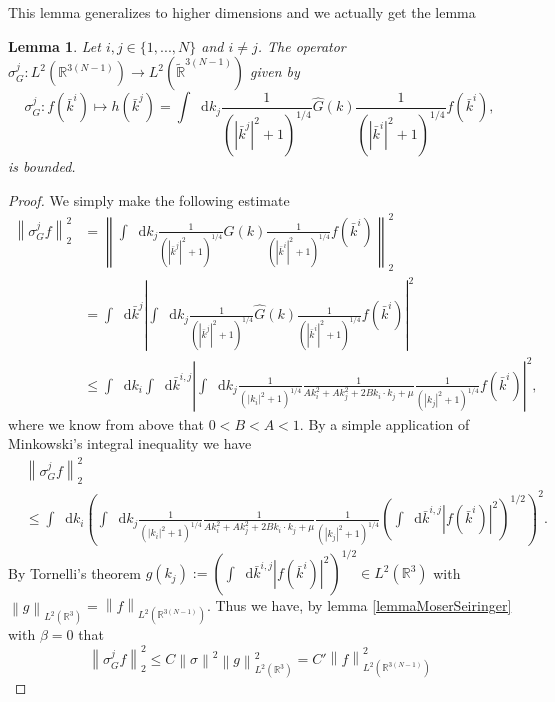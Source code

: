 \documentclass[a4paper,11pt]{article}
\newcommand{\norm}[1]{\left\lVert #1 \right\rVert}
\newcommand{\abs}[1]{\left\lvert #1 \right\rvert}
\newcommand*\diff{\mathop{}\!\mathrm{d}}
\newcommand{\R}{\mathbb{R}}
\newtheorem{lemma}{Lemma}
\numberwithin{equation}{section}
\begin{document}
This lemma generalizes to higher dimensions and we actually get the lemma\begin{lemma}\label{lemmaMoserSeiringerGen}
	Let $ i,j\in\{1,...,N\} $ and $ i\neq j $. The operator $ \sigma^j_G:L^2(\R^{3(N-1)})\to L^2(\tilde{\R}^{3(N-1)}) $ given by \begin{equation}
	\sigma^j_G: f(\bar{k}^i)\mapsto h(\bar{k}^j)= \int\diff k_j \frac{1}{(\abs{\bar{k}^j}^2+1)^{1/4}}\hat{G}(k)\frac{1}{(\abs{\bar{k}^i}^2+1)^{1/4}}f(\bar{k}^i),
	\end{equation}
	is bounded.
\end{lemma}
\begin{proof}
	We simply make the following estimate\begin{equation}
	\begin{aligned}
	\norm{\sigma_G^jf}_2^2&=\norm{\int\diff k_j \frac{1}{(\abs{\bar{k}^j}^2+1)^{1/4}}\hat{G}(k)\frac{1}{(\abs{\bar{k}^i}^2+1)^{1/4}}f(\bar{k}^i)}_2^2\\
	&=\int\diff\bar{k}^j\left\lvert\int\diff k_j \frac{1}{(\abs{\bar{k}^j}^2+1)^{1/4}}\hat{G}(k)\frac{1}{(\abs{\bar{k}^i}^2+1)^{1/4}}f(\bar{k}^i)\right\rvert^2\\
	&\leq\int\diff k_i\int\diff\bar{k}^{i,j}\left\lvert\int\diff k_j \frac{1}{(\abs{k_i}^2+1)^{1/4}}\frac{1}{Ak_i^2+Ak_j^2+2Bk_i\cdot k_j+\mu}\frac{1}{(\abs{k_j}^2+1)^{1/4}}f(\bar{k}^i)\right\rvert^2,
	\end{aligned}
	\end{equation}
	where we know from above that $ 0<B<A<1 $. By a simple application of Minkowski's integral inequality we have \begin{equation}
	\begin{aligned}
	&\norm{\sigma_G^jf}_2^2\\&\leq\int\diff k_i\left(\int\diff k_j \frac{1}{(\abs{k_i}^2+1)^{1/4}}\frac{1}{Ak_i^2+Ak_j^2+2Bk_i\cdot k_j+\mu}\frac{1}{(\abs{k_j}^2+1)^{1/4}}\left(\int\diff\bar{k}^{i,j}\abs{f(\bar{k}^i)}^2\right)^{1/2}\right)^2.
	\end{aligned}
	\end{equation}
	By Tornelli's theorem $ g(k_j):=\left(\int\diff\bar{k}^{i,j}\abs{f(\bar{k}^i)}^2\right)^{1/2}\in L^2(\R^3) $ with $ \norm{g}_{L^2(\R^3)}=\norm{f}_{L^2(\R^{3(N-1)})} $. Thus we have, by lemma \ref{lemmaMoserSeiringer} with $ \beta=0 $ that \begin{equation}
	\norm{\sigma_G^jf}_2^2\leq C\norm{\sigma}^2\norm{g}_{L^2(\R^3)}^2=C'\norm{f}^2_{L^2(\R^{3(N-1)})} 
	\end{equation}
\end{proof}
\end{document}
